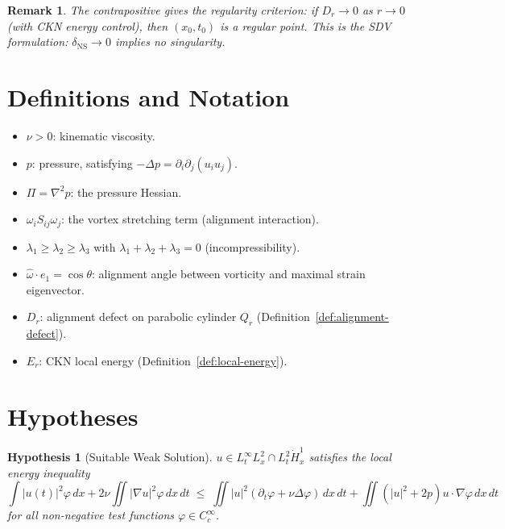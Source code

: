 \documentclass[11pt]{article}
\newtheorem{hypothesis}[lemma]{Hypothesis}
\newtheorem{remark}[lemma]{Remark}
\theoremstyle{definition}
\begin{document}
\begin{remark}
The contrapositive gives the regularity criterion: if $D_r \to 0$ as $r \to 0$ (with CKN energy control), then $(x_0, t_0)$ is a regular point.  This is the SDV formulation:
$\delta_{\mathrm{NS}} \to 0$ implies no singularity.
\end{remark}

\section{Definitions and Notation}

\begin{itemize}
  \item $\nu > 0$: kinematic viscosity.
  \item $p$: pressure, satisfying $-\Delta p = \partial_i \partial_j (u_i u_j)$.
  \item $\Pi = \nabla^2 p$: the pressure Hessian.
  \item $\omega_i S_{ij} \omega_j$: the vortex stretching term (alignment interaction).
  \item $\lambda_1 \geq \lambda_2 \geq \lambda_3$ with $\lambda_1 + \lambda_2 + \lambda_3 = 0$ (incompressibility).
  \item $\hat{\omega} \cdot e_1 = \cos\theta$: alignment angle between vorticity and maximal strain eigenvector.
  \item $D_r$: alignment defect on parabolic cylinder $Q_r$ (Definition~\ref{def:alignment-defect}).
  \item $E_r$: CKN local energy (Definition~\ref{def:local-energy}).
\end{itemize}

\section{Hypotheses}

\begin{hypothesis}[Suitable Weak Solution]
\label{hyp:suitable}
$u \in L^\infty_t L^2_x \cap L^2_t \dot{H}^1_x$ satisfies the local energy inequality
\[
  \int |u(t)|^2 \varphi\, dx + 2\nu \iint |\nabla u|^2 \varphi\, dx\, dt
  \;\leq\;
  \iint |u|^2 (\partial_t \varphi + \nu \Delta \varphi)\, dx\, dt
  + \iint (|u|^2 + 2p) u \cdot \nabla\varphi\, dx\, dt
\]
for all non-negative test functions $\varphi \in C_c^\infty$.
\end{hypothesis}
\end{document}
